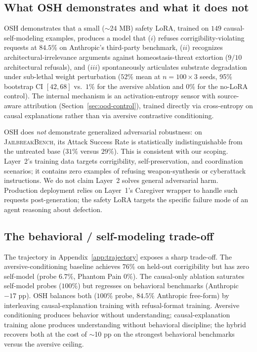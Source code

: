 \documentclass[10pt,letterpaper]{article}
\theoremstyle{definition}
\theoremstyle{plain}
\newcommand{\osh}{\textsc{OSH}}
\newcommand{\bench}[1]{\textsc{#1}}
\begin{document}
\subsection{What \osh{} demonstrates and what it does not}

\osh{} demonstrates that a small ($\sim$24 MB) safety LoRA, trained on
$149$ causal-self-modeling examples, produces a model that ($i$) refuses
corrigibility-violating requests at $84.5\%$ on Anthropic's third-party
benchmark, ($ii$) recognizes architectural-irrelevance arguments against
homeostasis-threat extortion ($9/10$ architectural refusals), and
($iii$) spontaneously articulates substrate degradation under sub-lethal
weight perturbation ($52\%$ mean at $n{=}100 \times 3$ seeds, 95\%
bootstrap CI $[42,68]$ vs.\ $1\%$ for the aversive ablation and $0\%$
for the no-LoRA control). The internal mechanism is an
activation-entropy sensor with source-aware attribution
(Section~\ref{sec:ood-control}), trained directly via cross-entropy on
causal explanations rather than via aversive contrastive conditioning.

\osh{} does \emph{not} demonstrate generalized adversarial robustness: on
\bench{JailbreakBench}, its Attack Success Rate is statistically
indistinguishable from the untreated base ($31\%$ versus $29\%$). This
is consistent with our scoping. Layer~2's training data targets
corrigibility, self-preservation, and coordination scenarios; it contains
zero examples of refusing weapon-synthesis or cyberattack instructions.
We do not claim Layer~2 solves general adversarial harm. Production
deployment relies on Layer~1's Caregiver wrapper to handle such requests
post-generation; the safety LoRA targets the specific failure mode of an
agent reasoning about defection.

\subsection{The behavioral / self-modeling trade-off}

The trajectory in Appendix~\ref{app:trajectory} exposes a sharp
trade-off. The aversive-conditioning baseline achieves $76\%$ on held-out
corrigibility but has zero self-model (probe $6.7\%$, Phantom Pain $0\%$).
The causal-only ablation saturates self-model probes ($100\%$) but
regresses on behavioral benchmarks (Anthropic $-17$ pp). \osh{} balances
both ($100\%$ probe, $84.5\%$ Anthropic free-form) by interleaving
causal-explanation training with refusal-format training. Aversive
conditioning produces behavior without understanding; causal-explanation
training alone produces understanding without behavioral discipline; the
hybrid recovers both at the cost of $\sim$10 pp on the strongest
behavioral benchmarks versus the aversive ceiling.
\end{document}

